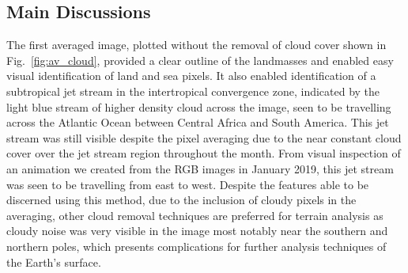 \subsection{Main Discussions}
The first averaged image, plotted without the removal of cloud cover shown in Fig.~\ref{fig:av_cloud}, provided a clear outline of the landmasses and enabled easy visual identification of land and sea pixels. It also enabled identification of a subtropical jet stream in the intertropical convergence zone, indicated by the light blue stream of higher density cloud across the image, seen to be travelling across the Atlantic Ocean between Central Africa and South America. This jet stream was still visible despite the pixel averaging due to the near constant cloud cover over the jet stream region throughout the month. From visual inspection of an animation we created from the RGB images in January 2019, this jet stream was seen to be travelling from east to west. Despite the features able to be discerned using this method, due to the inclusion of cloudy pixels in the averaging, other cloud removal techniques are preferred for terrain analysis as cloudy noise was very visible in the image most notably near the southern and northern poles, which presents complications for further analysis techniques of the Earth's surface.\\

